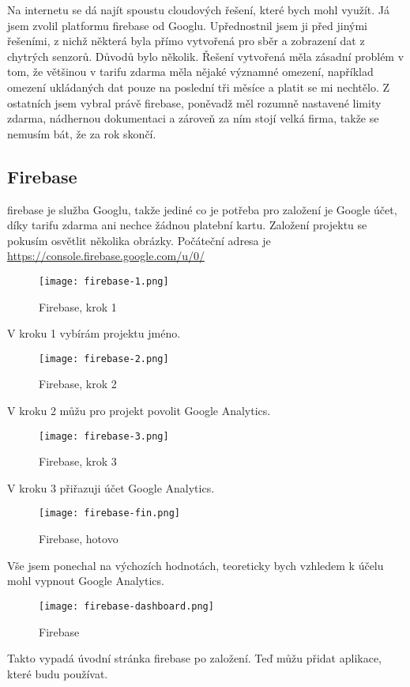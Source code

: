 Na internetu se dá najít spoustu cloudových řešení, které bych mohl využít. Já jsem zvolil platformu \gls{firebase} od 
Googlu. Upřednostnil jsem ji před jinými řešeními, z nichž některá byla přímo vytvořená pro sběr a zobrazení dat 
z chytrých senzorů. Důvodů bylo několik. Řešení vytvořená  měla zásadní problém v tom, že většinou v tarifu 
zdarma měla nějaké významné omezení, například omezení ukládaných dat pouze na poslední tři měsíce a platit se mi 
nechtělo. Z ostatních jsem vybral právě \gls{firebase}, poněvadž měl rozumně nastavené limity zdarma, nádhernou 
dokumentaci a zároveň za ním stojí velká firma, takže se nemusím bát, že za rok skončí.

\subsection{Firebase}
\gls{firebase} je služba Googlu, takže jediné co je potřeba pro založení je Google účet, díky tarifu zdarma ani nechce 
žádnou platební kartu. Založení projektu se pokusím osvětlit několika obrázky. Počáteční adresa je 
\url{https://console.firebase.google.com/u/0/}

\begin{figure}[H]
    \centering
    \texttt{[image: firebase-1.png]}
    \caption{Firebase, krok 1}
\end{figure}
V kroku 1 vybírám projektu jméno.
\begin{figure}[H]
    \centering
    \texttt{[image: firebase-2.png]}
    \caption{Firebase, krok 2}
\end{figure}
V kroku 2 můžu pro projekt povolit Google Analytics.
\begin{figure}[H]
    \centering
    \texttt{[image: firebase-3.png]}
    \caption{Firebase, krok 3}
\end{figure}
V kroku 3 přiřazuji účet Google Analytics.%
\begin{figure}[H]
    \centering
    \texttt{[image: firebase-fin.png]}
    \caption{Firebase, hotovo}
\end{figure}
Vše jsem ponechal na výchozích hodnotách, teoreticky bych vzhledem k účelu mohl vypnout Google Analytics.
\begin{figure}[H]
    \centering
    \texttt{[image: firebase-dashboard.png]}
    \caption{Firebase}
\end{figure}
Takto vypadá úvodní stránka \gls{firebase} po založení. Teď můžu přidat aplikace, které budu používat.

